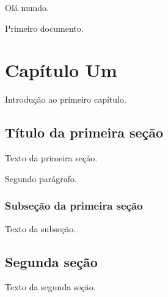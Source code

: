 \documentclass{book}
\begin{document}
Olá mundo.

Primeiro documento.

\chapter{Capítulo Um}
Introdução ao primeiro capítulo.

\section{Título da primeira seção}
Texto da primeira seção.

Segundo parágrafo.

\subsection{Subseção da primeira seção}

Texto da subseção.

\section{Segunda seção}
Texto da segunda seção.
\end{document}
